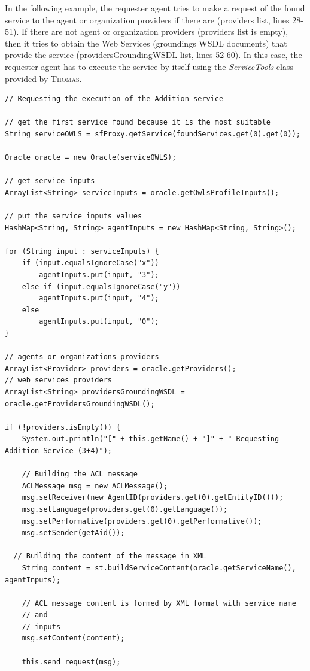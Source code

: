 In the following example, the requester agent tries to make a request of the found service to the agent or organization providers if there are (providers list, lines 28-51). If there are not agent or organization providers (providers list is empty), then it tries to obtain the Web Services (groundings WSDL documents) that provide the service (providersGroundingWSDL list, lines 52-60). In this case, the requester agent has to execute the service by itself using the \textit{ServiceTools} class provided by \textsc{Thomas}.



\begin{lstlisting}
// Requesting the execution of the Addition service

// get the first service found because it is the most suitable
String serviceOWLS = sfProxy.getService(foundServices.get(0).get(0));

Oracle oracle = new Oracle(serviceOWLS);

// get service inputs
ArrayList<String> serviceInputs = oracle.getOwlsProfileInputs();

// put the service inputs values
HashMap<String, String> agentInputs = new HashMap<String, String>();

for (String input : serviceInputs) {
	if (input.equalsIgnoreCase("x"))
		agentInputs.put(input, "3");
	else if (input.equalsIgnoreCase("y"))
		agentInputs.put(input, "4");
	else
		agentInputs.put(input, "0");
}

// agents or organizations providers
ArrayList<Provider> providers = oracle.getProviders();
// web services providers
ArrayList<String> providersGroundingWSDL = oracle.getProvidersGroundingWSDL();

if (!providers.isEmpty()) {
	System.out.println("[" + this.getName() + "]" + " Requesting Addition Service (3+4)");

	// Building the ACL message
	ACLMessage msg = new ACLMessage();
	msg.setReceiver(new AgentID(providers.get(0).getEntityID()));
	msg.setLanguage(providers.get(0).getLanguage());
	msg.setPerformative(providers.get(0).getPerformative());
	msg.setSender(getAid());

  // Building the content of the message in XML
	String content = st.buildServiceContent(oracle.getServiceName(), agentInputs);

	// ACL message content is formed by XML format with service name
	// and
	// inputs
	msg.setContent(content);

	this.send_request(msg);


\end{lstlisting}
